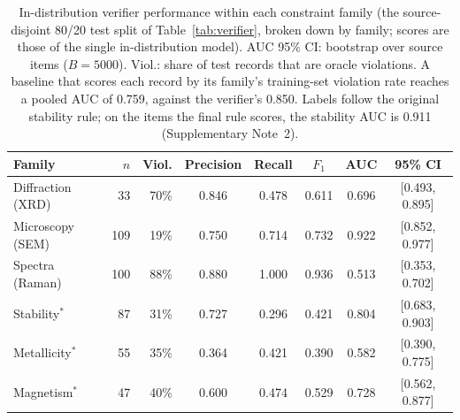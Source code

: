 \documentclass[pdflatex,sn-nature]{sn-jnl}
\newcommand{\revon}{}
\newcommand{\revon}{\color{blue}}%
\begin{document}
\begin{table}[t]
\revon\centering
\caption{\justifying In-distribution verifier performance within each constraint family (the
source-disjoint 80/20 test split of Table~\ref{tab:verifier}, broken down by family; scores are those of
the single in-distribution model). AUC 95\% CI: bootstrap over source items ($B=5000$).
Viol.: share of test records that are oracle violations. A baseline that scores each record by
its family's training-set violation rate reaches a pooled AUC of 0.759, against the verifier's
0.850. Labels follow the original stability rule; on the items the final rule scores, the stability AUC is
0.911 (Supplementary Note~2).}
\label{tab:verifierfam}
{\scriptsize\setlength{\tabcolsep}{5pt}\renewcommand{\arraystretch}{1.12}
\begin{tabular}{l r r S[table-format=1.3] S[table-format=1.3] S[table-format=1.3] S[table-format=1.3] c}
\toprule
Family & $n$ & {Viol.} & {Precision} & {Recall} & {$F_1$} & {AUC} & {95\% CI} \\
\midrule
Diffraction (XRD)  & 33  & 70\% & 0.846 & 0.478 & 0.611 & 0.696 & {[}0.493, 0.895{]} \\
Microscopy (SEM)   & 109 & 19\% & 0.750 & 0.714 & 0.732 & 0.922 & {[}0.852, 0.977{]} \\
Spectra (Raman)    & 100 & 88\% & 0.880 & 1.000 & 0.936 & 0.513 & {[}0.353, 0.702{]} \\
Stability$^{*}$    & 87  & 31\% & 0.727 & 0.296 & 0.421 & 0.804 & {[}0.683, 0.903{]} \\
Metallicity$^{*}$  & 55  & 35\% & 0.364 & 0.421 & 0.390 & 0.582 & {[}0.390, 0.775{]} \\
Magnetism$^{*}$    & 47  & 40\% & 0.600 & 0.474 & 0.529 & 0.728 & {[}0.562, 0.877{]} \\
\bottomrule
\end{tabular}}
\end{table}
\end{document}

